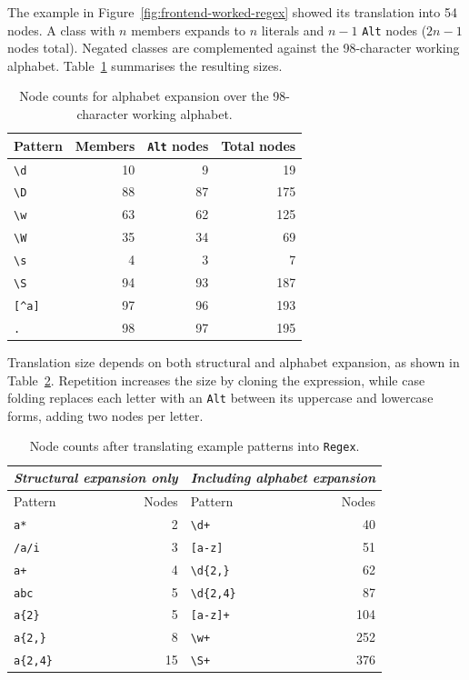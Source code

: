 The example in Figure~\ref{fig:frontend-worked-regex} 
showed its translation into 54 nodes. 
A class with $n$ members expands to $n$ literals 
and $n-1$ \texttt{Alt} nodes ($2n-1$ nodes total).
Negated classes are complemented against the 98-character working alphabet. 
Table~\ref{tab:alphabet-expansion-sizes} summarises the resulting sizes.
\begin{table}[ht]
\centering
\small
\setlength{\tabcolsep}{5pt}
\begin{tabular}{@{}lrrr@{}}
\hline
Pattern & Members & \texttt{Alt} nodes & Total nodes \\
\hline
\texttt{\textbackslash d} & 10 & 9 & 19 \\
\texttt{\textbackslash D} & 88 & 87 & 175 \\
\texttt{\textbackslash w} & 63 & 62 & 125 \\
\texttt{\textbackslash W} & 35 & 34 & 69 \\
\texttt{\textbackslash s} & 4 & 3 & 7 \\
\texttt{\textbackslash S} & 94 & 93 & 187 \\
\hline
\texttt{[\textasciicircum a]} & 97 & 96 & 193 \\
\texttt{.} & 98 & 97 & 195 \\
\hline
\end{tabular}
\caption{Node counts for alphabet expansion over the 98-character
working alphabet.}
\label{tab:alphabet-expansion-sizes}
\end{table}

Translation size depends on both structural and alphabet expansion, 
as shown in Table~\ref{tab:translation-sizes}. 
Repetition increases the size by cloning the expression, 
while case folding replaces each letter with an \texttt{Alt} 
between its uppercase and lowercase forms,
adding two nodes per letter. 
\begin{table}[ht]
\centering
\small
\setlength{\tabcolsep}{4pt}
\begin{tabular}{@{}lr@{\hspace{6em}}lr@{}}
\hline
\multicolumn{2}{c}{\textit{Structural expansion only}}
& \multicolumn{2}{c}{\textit{Including alphabet expansion}} \\
\hline
Pattern & Nodes & Pattern & Nodes \\
\hline
\texttt{a*}         &   2 & \texttt{\textbackslash d+}       &  40 \\
\texttt{/a/i}       &   3 & \texttt{[a-z]}                   &  51 \\
\texttt{a+}         &   4 & \texttt{\textbackslash d\{2,\}}  &  62 \\
\texttt{abc}        &   5 & \texttt{\textbackslash d\{2,4\}} &  87 \\
\texttt{a\{2\}}     &   5 & \texttt{[a-z]+}                  & 104 \\
\texttt{a\{2,\}}    &   8 & \texttt{\textbackslash w+}       & 252 \\
\texttt{a\{2,4\}}   &  15 & \texttt{\textbackslash S+}       & 376 \\
\hline
\end{tabular}
\caption{Node counts after translating example patterns into \texttt{Regex}.}
\label{tab:translation-sizes}
\end{table}

